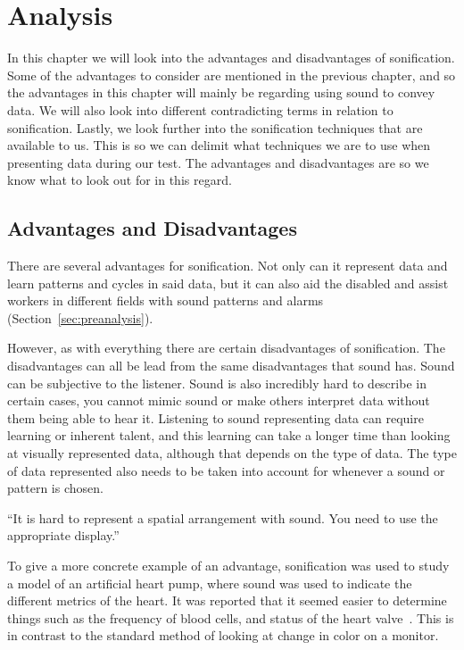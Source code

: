 
\section{Analysis} %
\label{sec:analysis}

In this chapter we will look into the advantages and disadvantages of sonification. Some of the advantages to consider are mentioned in the previous chapter, and so the advantages in this chapter will mainly be regarding using sound to convey data. We will also look into different contradicting terms in relation to sonification. Lastly, we look further into the sonification techniques that are available to us. This is so we can delimit what techniques we are to use when presenting data during our test. The advantages and disadvantages are so we know what to look out for in this regard.

\FloatBarrier
\subsection{Advantages and Disadvantages} %
\label{sub:advantages_and_disadvantages_of_sonification}

There are several advantages for sonification. Not only can it represent data and learn patterns and cycles in said data, but it can also aid the disabled and assist workers in different fields with sound patterns and alarms (Section~\ref{sec:preanalysis}).

However, as with everything there are certain disadvantages of sonification. The disadvantages can all be lead from the same disadvantages that sound has. Sound can be subjective to the listener. Sound is also incredibly hard to describe in certain cases, you cannot mimic sound or make others interpret data without them being able to hear it. Listening to sound representing data can require learning or inherent talent, and this learning can take a longer time than looking at visually represented data, although that depends on the type of data. The type of data represented also needs to be taken into account for whenever a sound or pattern is chosen. 


\enquote{It is hard to represent a spatial arrangement with sound. You need to use the appropriate display.}~\cite*[pp.21-22]{Feder2012}

To give a more concrete example of an advantage, sonification was used to study a model of an artificial heart pump, where sound was used to indicate the different metrics of the heart. It was reported that it seemed easier to determine things such as the frequency of blood cells, and status of the heart valve~\cite*[pp.24]{Barrass1999}.
This is in contrast to the standard method of looking at change in color on a monitor. 

